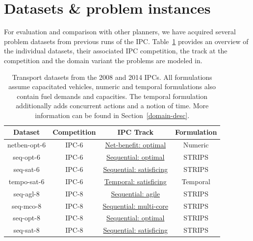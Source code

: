\section{Datasets \& problem instances}\label{datasets}

For evaluation and comparison with other planners, we have acquired several problem datasets from previous runs of the IPC.
Table~\ref{tab:ipc-datasets} provides an overview of the individual datasets, their associated IPC competition, the track at the competition and the domain variant the problems are modeled in.

\begin{table}[tb]
\centering
\begin{tabular}{c||ccc}
\textbf{Dataset} & \textbf{Competition} & \textbf{IPC Track} & \textbf{Formulation} \\ 
\midrule
\midrule
netben-opt-6 & IPC-6 & \href{http://icaps-conference.org/ipc2008/deterministic/NetBenefitOptimization.html}{Net-benefit: optimal} & Numeric \\ 
seq-opt-6 & IPC-6 & \href{http://icaps-conference.org/ipc2008/deterministic/SequentialOptimization.html}{Sequential: optimal} & STRIPS \\ 
seq-sat-6 & IPC-6 & \href{http://icaps-conference.org/ipc2008/deterministic/SequentialSatisficing.html}{Sequential: satisficing} & STRIPS \\ 
tempo-sat-6 & IPC-6 & \href{http://icaps-conference.org/ipc2008/deterministic/TemporalSatisficing.html}{Temporal: satisficing} & Temporal \\ 
\midrule
seq-agl-8 & IPC-8 & \href{https://helios.hud.ac.uk/scommv/IPC-14/seqagi.html}{Sequential: agile} & STRIPS \\ 
seq-mco-8 & IPC-8 & \href{https://helios.hud.ac.uk/scommv/IPC-14/seqmulti.html}{Sequential: multi-core} & STRIPS \\ 
seq-opt-8 & IPC-8 & \href{https://helios.hud.ac.uk/scommv/IPC-14/seqopt.html}{Sequential: optimal} & STRIPS \\ 
seq-sat-8 & IPC-8 & \href{https://helios.hud.ac.uk/scommv/IPC-14/seqsat.html}{Sequential: satisficing} & STRIPS \\ 
\end{tabular}
\caption[Transport datasets from the 2008 and 2014 IPCs.]{Transport datasets from the 2008 and 2014 IPCs. All formulations assume capacitated vehicles, numeric and temporal formulations also contain fuel demands and capacities. The temporal formulation additionally adds concurrent actions and a notion of time. More information can be found in Section~\ref{domain-desc}.}
\label{tab:ipc-datasets}
\end{table}

